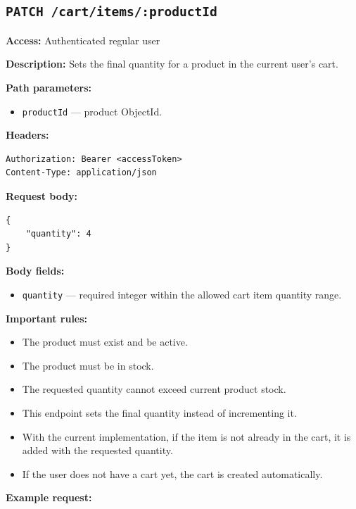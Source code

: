\subsection{\texttt{PATCH /cart/items/:productId}}

\textbf{Access:} Authenticated regular user

\textbf{Description:} Sets the final quantity for a product in the current user's cart.

\textbf{Path parameters:}

\begin{itemize}
    \item \texttt{productId} --- product ObjectId.
\end{itemize}

\textbf{Headers:}

\begin{verbatim}
Authorization: Bearer <accessToken>
Content-Type: application/json
\end{verbatim}

\textbf{Request body:}

\begin{verbatim}
{
    "quantity": 4
}
\end{verbatim}

\textbf{Body fields:}

\begin{itemize}
    \item \texttt{quantity} --- required integer within the allowed cart item quantity range.
\end{itemize}

\textbf{Important rules:}

\begin{itemize}
    \item The product must exist and be active.
    \item The product must be in stock.
    \item The requested quantity cannot exceed current product stock.
    \item This endpoint sets the final quantity instead of incrementing it.
    \item With the current implementation, if the item is not already in the cart, it is added with the requested quantity.
    \item If the user does not have a cart yet, the cart is created automatically.
\end{itemize}

\textbf{Example request:}

